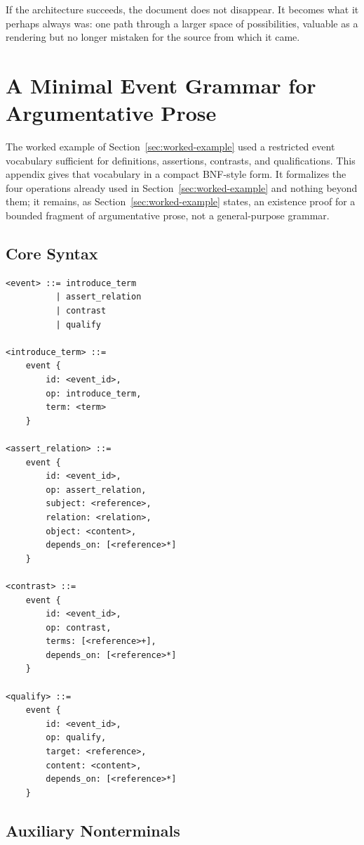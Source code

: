\documentclass[11pt]{article}
\theoremstyle{definition}
\begin{document}
If the architecture succeeds, the document does not disappear. It becomes what it perhaps always was: one path through a larger space of possibilities, valuable as a rendering but no longer mistaken for the source from which it came.

\clearpage
\appendix
\section{A Minimal Event Grammar for Argumentative Prose}
\label{app:grammar}

The worked example of Section~\ref{sec:worked-example} used a restricted event vocabulary sufficient for definitions, assertions, contrasts, and qualifications. This appendix gives that vocabulary in a compact BNF-style form. It formalizes the four operations already used in Section~\ref{sec:worked-example} and nothing beyond them; it remains, as Section~\ref{sec:worked-example} states, an existence proof for a bounded fragment of argumentative prose, not a general-purpose grammar.

\subsection{Core Syntax}

\begin{verbatim}
<event> ::= introduce_term
          | assert_relation
          | contrast
          | qualify

<introduce_term> ::=
    event {
        id: <event_id>,
        op: introduce_term,
        term: <term>
    }

<assert_relation> ::=
    event {
        id: <event_id>,
        op: assert_relation,
        subject: <reference>,
        relation: <relation>,
        object: <content>,
        depends_on: [<reference>*]
    }

<contrast> ::=
    event {
        id: <event_id>,
        op: contrast,
        terms: [<reference>+],
        depends_on: [<reference>*]
    }

<qualify> ::=
    event {
        id: <event_id>,
        op: qualify,
        target: <reference>,
        content: <content>,
        depends_on: [<reference>*]
    }
\end{verbatim}

\subsection{Auxiliary Nonterminals}
\end{document}
